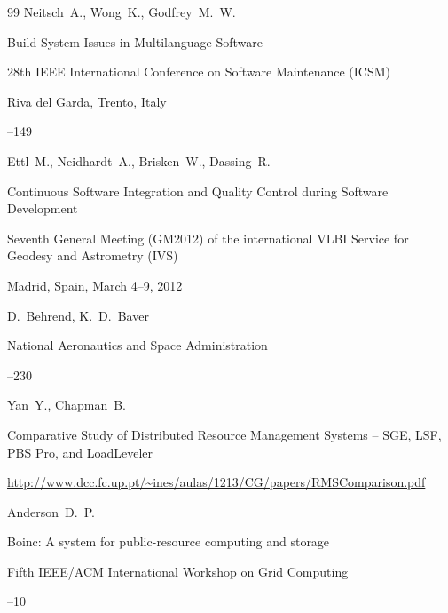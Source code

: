 \begin{thebibliography}{99}
\by Neitsch~A., Wong~K., Godfrey~M.~W.


\paper Build System Issues in   Multilanguage Software

\inbook  28th IEEE International Conference on Software Maintenance (ICSM)


\publaddr Riva del Garda, Trento, Italy

--149






\by Ettl~M., Neidhardt~A., Brisken~W., Dassing~R.

\paper Continuous Software   Integration and Quality Control during Software Development

\inbook Seventh General Meeting (GM2012) of the international VLBI Service for Geodesy and Astrometry (IVS)

\procinfo Madrid, Spain, March 4--9, 2012

  \eds D.~Behrend, K.~D.~Baver

\publaddr National Aeronautics and Space Administration


--230






\by Yan~Y., Chapman~B.

\preprint Comparative Study of Distributed Resource Management Systems – SGE, LSF, PBS Pro, and LoadLeveler

\elink \url{http://www.dcc.fc.up.pt/~ines/aulas/1213/CG/papers/RMSComparison.pdf}






\by Anderson~D.~P.

\paper Boinc: A system for public-resource computing and   storage


\inbook  Fifth IEEE/ACM International Workshop on Grid Computing


--10






\end{thebibliography}
